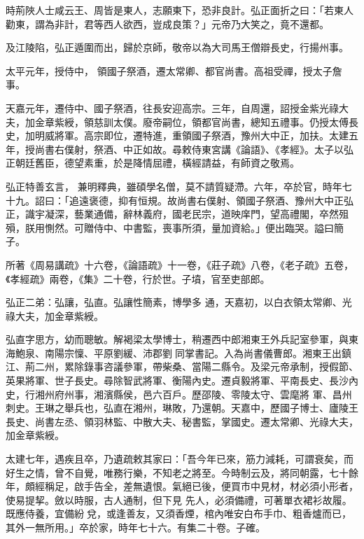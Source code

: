 \begin{pinyinscope}
 時荊陜人士咸云王、周皆是東人，志願東下，恐非良計。弘正面折之曰：「若東人勸東，謂為非計，君等西人欲西，豈成良策？」元帝乃大笑之，竟不還都。



 及江陵陷，弘正遁圍而出，歸於京師，敬帝以為大司馬王僧辯長史，行揚州事。



 太平元年，授侍中，
 領國子祭酒，遷太常卿、都官尚書。高祖受禪，授太子詹事。



 天嘉元年，遷侍中、國子祭酒，往長安迎高宗。三年，自周還，詔授金紫光祿大夫，加金章紫綬，領慈訓太僕。廢帝嗣位，領都官尚書，總知五禮事。仍授太傅長史，加明威將軍。高宗即位，遷特進，重領國子祭酒，豫州大中正，加扶。太建五年，授尚書右僕射，祭酒、中正如故。尋敕侍東宮講《論語》、《孝經》。太子以弘正朝廷舊臣，德望素重，於是降情屈禮，橫經請益，有師資之敬焉。



 弘正特善玄言，
 兼明釋典，雖碩學名僧，莫不請質疑滯。六年，卒於官，時年七十九。詔曰：「追遠褒德，抑有恒規。故尚書右僕射、領國子祭酒、豫州大中正弘正，識宇凝深，藝業通備，辭林義府，國老民宗，道映庠門，望高禮閣，卒然殂殞，朕用惻然。可贈侍中、中書監，喪事所須，量加資給。」便出臨哭。謚曰簡子。



 所著《周易講疏》十六卷，《論語疏》十一卷，《莊子疏》八卷，《老子疏》五卷，《孝經疏》兩卷，《集》二十卷，行於世。子墳，官至吏部郎。



 弘正二弟：弘讓，弘直。弘讓性簡素，博學多
 通，天嘉初，以白衣領太常卿、光祿大夫，加金章紫綬。



 弘直字思方，幼而聰敏。解褐梁太學博士，稍遷西中郎湘東王外兵記室參軍，與東海鮑泉、南陽宗懍、平原劉緩、沛郡劉同掌書記。入為尚書儀曹郎。湘東王出鎮江、荊二州，累除錄事咨議參軍，帶柴桑、當陽二縣令。及梁元帝承制，授假節、英果將軍、世子長史。尋除智武將軍、衡陽內史。遷貞毅將軍、平南長史、長沙內史，行湘州府州事，湘濱縣侯，邑六百戶。歷邵陵、零陵太守、雲麾將
 軍、昌州刺史。王琳之舉兵也，弘直在湘州，琳敗，乃還朝。天嘉中，歷國子博士、廬陵王長史、尚書左丞、領羽林監、中散大夫、秘書監，掌國史。遷太常卿、光祿大夫，加金章紫綬。



 太建七年，遇疾且卒，乃遺疏敕其家曰：「吾今年已來，筋力減耗，可謂衰矣，而好生之情，曾不自覺，唯務行樂，不知老之將至。今時制云及，將同朝露，七十餘年，頗經稱足，啟手告全，差無遺恨。氣絕已後，便買市中見材，材必須小形者，使易提挈。斂以時服，古人通制，但下見
 先人，必須備禮，可著單衣裙衫故履。既應侍養，宜備紛兌，或逢善友，又須香煙，棺內唯安白布手巾、粗香爐而已，其外一無所用。」卒於家，時年七十六。有集二十卷。子確。




\end{pinyinscope}
